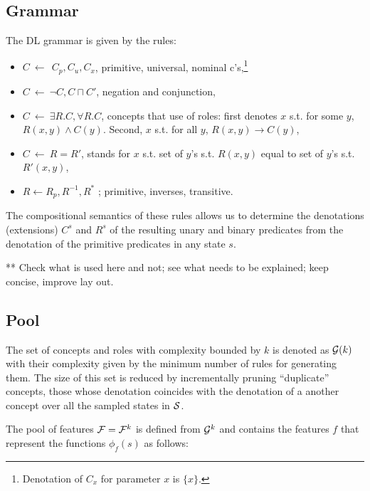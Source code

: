 \documentclass[letterpaper]{article} %
\begin{document}
\subsection{Grammar}

The DL grammar is given by the rules:

  \begin{itemize}
  \item $C \ \leftarrow\ \ C_p, C_u, C_x$, primitive, universal,  nominal c's,\footnote{Denotation of $C_x$ for parameter $x$ is $\{x\}$.}
  \item $C \ \leftarrow\  \neg C, C \sqcap C'$, negation and conjunction, 
  \item $C \ \leftarrow\  \exists R.C , \forall R.C$, concepts that use of  roles: first denotes $x$ s.t. for some  $y$,  $R(x,y) \land C(y)$.
  Second,  $x$ s.t. for all $y$, $R(x,y) \rightarrow C(y)$,
  \item $C \ \leftarrow\  R=R'$, stands for $x$ s.t. set of $y$'s  s.t. $R(x,y)$ equal to set of $y$'s s.t. $R'(x,y)$,
    \item $R \leftarrow R_p, R^{-1}, R^*$ ; primitive, inverses, transitive.
 \end{itemize}

The  compositional  semantics   of these rules allows us to determine the denotations (extensions)   $C^s$ and $R^s$  of
the resulting unary and binary predicates from the denotation of the primitive predicates in any  state $s$. 

** Check what is used here and not; see what needs to be explained; keep concise, improve lay out.


\subsection{Pool}


The set of  concepts and roles  with complexity bounded by $k$ is denoted as ${\cal G}(k)$
with their  complexity given by the    minimum number of  rules for generating them.
The size  of this set is reduced by incrementally pruning ``duplicate'' concepts,
those whose denotation coincides with the denotation of a another concept over all
the sampled states in ${\cal S}$. 

The pool of features ${\cal F}={\cal F}^k$  is defined from   ${\cal G}^k$
and contains the  features $f$ that represent the functions $\phi_f(s)$
as follows:
\end{document}
